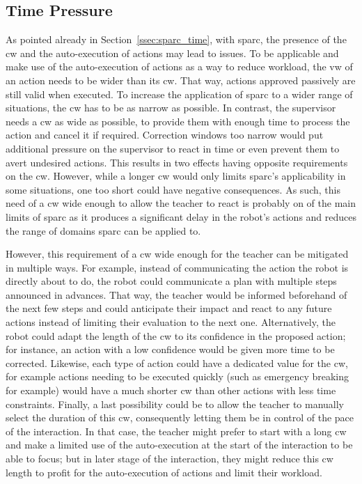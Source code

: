 \subsection{Time Pressure}
As pointed already in Section~\ref{ssec:sparc_time}, with \gls{sparc}, the presence of the \gls{cw} and the auto-execution of actions may lead to issues. To be applicable and make use of the auto-execution of actions as a way to reduce workload, the \gls{vw} of an action needs to be wider than its \gls{cw}. That way, actions approved passively are still valid when executed. To increase the application of \gls{sparc} to a wider range of situations, the \gls{cw} has to be as narrow as possible. In contrast, the supervisor needs a \gls{cw} as wide as possible, to provide them with enough time to process the action and cancel it if required. Correction windows too narrow would put additional pressure on the supervisor to react in time or even prevent them to avert undesired actions. %
This results in two effects having opposite requirements on the \gls{cw}. However, while a longer \gls{cw} would only limits \gls{sparc}'s applicability in some situations, one too short could have negative consequences. As such, this need of a \gls{cw} wide enough to allow the teacher to react is probably on of the main limits of \gls{sparc} as it produces a significant delay in the robot's actions and reduces the range of domains \gls{sparc} can be applied to.

However, this requirement of a \gls{cw} wide enough for the teacher can be mitigated in multiple ways. For example, instead of communicating the action the robot is directly about to do, the robot could communicate a plan with multiple steps announced in advances. That way, the teacher would be informed beforehand of the next few steps and could anticipate their impact and react to any future actions instead of limiting their evaluation to the next one. Alternatively, the robot could adapt the length of the \gls{cw} to its confidence in the proposed action; for instance, an action with a low confidence would be given more time to be corrected. Likewise, each type of action could have a dedicated value for the \gls{cw}, for example actions needing to be executed quickly (such as emergency breaking for example) would have a much shorter \gls{cw} than other actions with less time constraints. Finally, a last possibility could be to allow the teacher to manually select the duration of this \gls{cw}, consequently letting them be in control of the pace of the interaction. In that case, the teacher might prefer to start with a long \gls{cw} and make a limited use of the auto-execution at the start of the interaction to be able to focus; but in later stage of the interaction, they might reduce this \gls{cw} length to profit for the auto-execution of actions and limit their workload.


